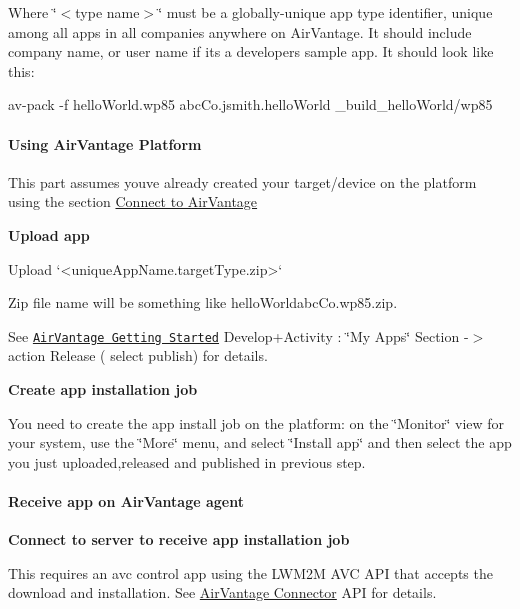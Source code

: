 Where \char`\"{}$<$type name$>$\char`\"{} must be a globally-\/unique app type identifier, unique among all apps in all companies anywhere on Air\+Vantage. It should include company name, or user name if it\textquotesingle{}s a developer\textquotesingle{}s sample app. It should look like this\+:

\begin{DoxyVerb} av-pack -f helloWorld.wp85 abcCo.jsmith.helloWorld _build_helloWorld/wp85
\end{DoxyVerb}
\hypertarget{how_to_a_v_install_app_appInstallAirVantage_usingAv}{}\paragraph{Using Air\+Vantage Platform}\label{how_to_a_v_install_app_appInstallAirVantage_usingAv}
This part assumes you\textquotesingle{}ve already created your target/device on the platform using the section \hyperlink{connecting_air_vantage}{Connect to Air\+Vantage}

{\bfseries Upload app}

\begin{DoxyVerb}Upload `<uniqueAppName.targetType.zip>`
\end{DoxyVerb}


Zip file name will be something like {\ttfamily hello\+Worldabc\+Co.\+wp85.\+zip}.

See \href{https://doc.airvantage.net/display/USERGUIDE/Getting+Started}{\tt Air\+Vantage Getting Started} Develop+\+Activity \+: \char`\"{}\+My
\+Apps\char`\"{} Section -\/$>$ action Release ( select publish) for details.

{\bfseries Create app installation job}

You need to create the app install job on the platform\+: on the \char`\"{}\+Monitor\char`\"{} view for your system, use the \char`\"{}\+More\char`\"{} menu, and select \char`\"{}\+Install app\char`\"{} and then select the app you just uploaded,released and published in previous step.\hypertarget{how_to_a_v_install_app_appInstallAirVantage_rcvAppAgent}{}\paragraph{Receive app on Air\+Vantage agent}\label{how_to_a_v_install_app_appInstallAirVantage_rcvAppAgent}
{\bfseries Connect to server to receive app installation job}

This requires an {\ttfamily avc} control app using the L\+W\+M2\+M A\+V\+C A\+P\+I that accepts the download and installation. See \hyperlink{c_le_avc}{Air\+Vantage Connector} A\+P\+I for details.

